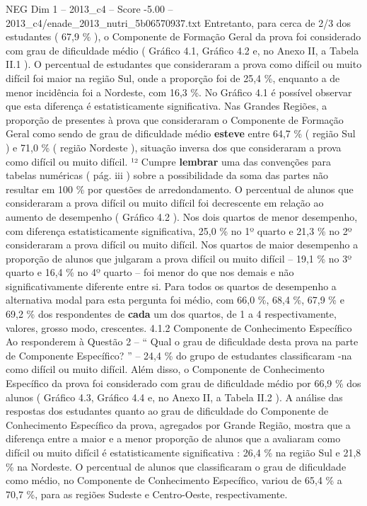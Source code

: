 \begin{textsample}{NEG Dim 1 – 2013\_c4 – Score -5.00 – 2013\_c4/enade\_2013\_nutri\_5b06570937.txt}
Entretanto, para cerca de 2/3 dos estudantes ( 67,9 \% ), o Componente de Formação Geral da prova foi considerado com grau de dificuldade médio ( Gráfico 4.1, Gráfico 4.2 e, no Anexo II, a Tabela II.1 ).
O percentual de estudantes que consideraram a prova como difícil ou muito difícil foi maior na região Sul, onde a proporção foi de 25,4 \%, enquanto a de menor incidência foi a Nordeste, com 16,3 \%.
No Gráfico 4.1 é possível observar que esta diferença é estatisticamente significativa.
Nas Grandes Regiões, a proporção de presentes à prova que consideraram o Componente de Formação Geral como sendo de grau de dificuldade médio \textbf{esteve} entre 64,7 \% ( região Sul ) e 71,0 \% ( região Nordeste ), situação inversa dos que consideraram a prova como difícil ou muito difícil. ¹² Cumpre \textbf{lembrar} uma das convenções para tabelas numéricas ( pág. iii ) sobre a possibilidade da soma das partes não resultar em 100 \% por questões de arredondamento.
O percentual de alunos que consideraram a prova difícil ou muito difícil foi decrescente em relação ao aumento de desempenho ( Gráfico 4.2 ).
Nos dois quartos de menor desempenho, com diferença estatisticamente significativa, 25,0 \% no 1º quarto e 21,3 \% no 2º consideraram a prova difícil ou muito difícil.
Nos quartos de maior desempenho a proporção de alunos que julgaram a prova difícil ou muito difícil – 19,1 \% no 3º quarto e 16,4 \% no 4º quarto – foi menor do que nos demais e não significativamente diferente entre si.
Para todos os quartos de desempenho a alternativa modal para esta pergunta foi médio, com 66,0 \%, 68,4 \%, 67,9 \% e 69,2 \% dos respondentes de \textbf{cada} um dos quartos, de 1 a 4 respectivamente, valores, grosso modo, crescentes. 4.1.2 Componente de Conhecimento Específico Ao responderem à Questão 2 – “ Qual o grau de dificuldade desta prova na parte de Componente Específico? ” – 24,4 \% do grupo de estudantes classificaram -na como difícil ou muito difícil.
Além disso, o Componente de Conhecimento Específico da prova foi considerado com grau de dificuldade médio por 66,9 \% dos alunos ( Gráfico 4.3, Gráfico 4.4 e, no Anexo II, a Tabela II.2 ).
A análise das respostas dos estudantes quanto ao grau de dificuldade do Componente de Conhecimento Específico da prova, agregados por Grande Região, mostra que a diferença entre a maior e a menor proporção de alunos que a avaliaram como difícil ou muito difícil é estatisticamente significativa : 26,4 \% na região Sul e 21,8 \% na Nordeste.
O percentual de alunos que classificaram o grau de dificuldade como médio, no Componente de Conhecimento Específico, variou de 65,4 \% a 70,7 \%, para as regiões Sudeste e Centro-Oeste, respectivamente.

\end{textsample}

